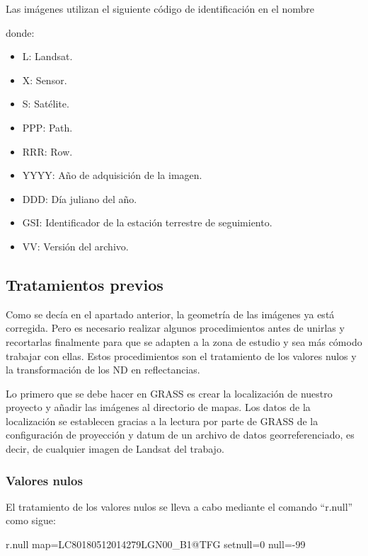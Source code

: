 Las imágenes utilizan el siguiente código de identificación en el nombre \citep{Ariza2013}

\begin{center}
\end{center}

donde:

\begin{itemize}
	\item L: Landsat.
	\item X: Sensor.
	\item S: Satélite.
	\item PPP: Path.
	\item RRR: Row.
	\item YYYY: Año de adquisición de la imagen.
	\item DDD: Día juliano del año.
	\item GSI: Identificador de la estación terrestre de seguimiento.
	\item VV: Versión del archivo.
\end{itemize}

\subsection{Tratamientos previos}
Como se decía en el apartado anterior, la geometría de las imágenes ya está corregida. Pero es necesario realizar algunos procedimientos antes de unirlas y recortarlas finalmente para que se adapten a la zona de estudio y sea más cómodo trabajar con ellas. Estos procedimientos son el tratamiento de los valores nulos y la transformación de los \ac{ND} en reflectancias.\Sep

Lo primero que se debe hacer en GRASS es crear la localización de nuestro proyecto y añadir las imágenes al directorio de mapas. Los datos de la localización se establecen gracias a la lectura por parte de GRASS de la configuración de proyección y datum de un archivo de datos georreferenciado, es decir, de cualquier imagen de Landsat del trabajo.

\subsubsection{Valores nulos}
El tratamiento de los valores nulos se lleva a cabo mediante el comando ``r.null'' como sigue:

\begin{center}
\begin{boxedverbatim}
	r.null map=LC80180512014279LGN00_B1@TFG setnull=0 null=-99
\end{boxedverbatim}
\end{center}

